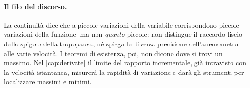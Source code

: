 \paragraph{Il filo del discorso.} La continuità dice che a piccole variazioni della
variabile corrispondono piccole variazioni della funzione, ma non \emph{quanto}
piccole: non distingue il raccordo liscio dallo spigolo della tropopausa, né spiega la
diversa precisione dell'anemometro alle varie velocità. I teoremi di esistenza, poi,
non dicono dove si trovi un massimo. Nel \cref{cap:derivate} il limite del rapporto
incrementale, già intravisto con la velocità istantanea, misurerà la rapidità di
variazione e darà gli strumenti per localizzare massimi e minimi.
